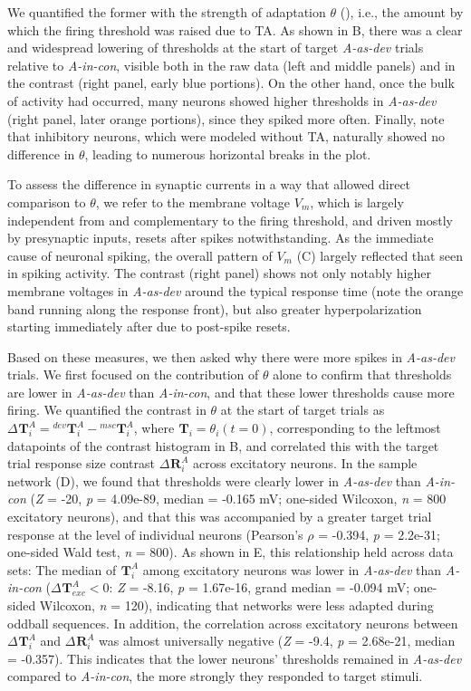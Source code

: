\documentclass[9pt,lineno,onehalfspacing]{elife}
\newcommand{\dev}{\textit{A-as-dev}}
\newcommand{\msc}{\textit{A-in-con}}
\newcommand{\R}[3][]{{}^{#1}_{}\boldsymbol R^{#2}_{#3}}
\newcommand{\T}[3][]{{}^{#1}_{}\boldsymbol T^{#2}_{#3}}
\begin{document}
We quantified the former with the strength of adaptation $\theta$ (), i.e., the amount by which the firing threshold was raised due to TA. As shown in B, there was a clear and widespread lowering of thresholds at the start of target \dev{} trials relative to \msc{}, visible both in the raw data (left and middle panels) and in the contrast (right panel, early blue portions). On the other hand, once the bulk of activity had occurred, many neurons showed higher thresholds in \dev{} (right panel, later orange portions), since they spiked more often. Finally, note that inhibitory neurons, which were modeled without TA, naturally showed no difference in $\theta$, leading to numerous horizontal breaks in the plot.

To assess the difference in synaptic currents in a way that allowed direct comparison to $\theta$, we refer to the membrane voltage $V_m$, which is largely independent from and complementary to the firing threshold, and driven mostly by presynaptic inputs, resets after spikes notwithstanding. As the immediate cause of neuronal spiking, the overall pattern of $V_m$ (C) largely reflected that seen in spiking activity. The contrast (right panel) shows not only notably higher membrane voltages in \dev{} around the typical response time (note the orange band running along the response front), but also greater hyperpolarization starting immediately after due to post-spike resets.

Based on these measures, we then asked why there were more spikes in \dev{} trials. We first focused on the contribution of $\theta$ alone to confirm that thresholds are lower in \dev{} than \msc{}, and that these lower thresholds cause more firing. We quantified the contrast in $\theta$ at the start of target trials as $\Delta \T{A}{i} = \T[dev]{A}{i} - \T[msc]{A}{i}$, where $\T{}{i} = \theta_i(t=0)$, corresponding to the leftmost datapoints of the contrast histogram in B, and correlated this with the target trial response size contrast $\Delta \R{A}{i}$ across excitatory neurons. In the sample network (D), we found that thresholds were clearly lower in \dev{} than \msc{} (\textit{Z} = -20, \textit{p} = 4.09e-89, median = -0.165 mV; one-sided Wilcoxon, \textit{n} = 800 excitatory neurons), and that this was accompanied by a greater target trial response at the level of individual neurons (Pearson's $\rho$ = -0.394, \textit{p} = 2.2e-31; one-sided Wald test, \textit{n} = 800). As shown in E, this relationship held across data sets: The median of $\T{A}{i}$ among excitatory neurons was lower in \dev{} than \msc{} ($\Delta \T{A}{exc} < 0$: \textit{Z} = -8.16, \textit{p} = 1.67e-16, grand median = -0.094 mV; one-sided Wilcoxon, \textit{n} = 120), indicating that networks were less adapted during oddball sequences. In addition, the correlation across excitatory neurons between $\Delta \T{A}{i}$ and $\Delta \R{A}{i}$ was almost universally negative (\textit{Z} = -9.4, \textit{p} = 2.68e-21, median = -0.357). This indicates that the lower neurons' thresholds remained in \dev{} compared to \msc{}, the more strongly they responded to target stimuli.
\end{document}
